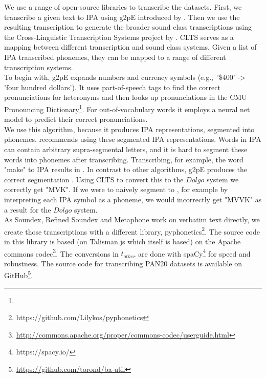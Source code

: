 We use a range of open-source libraries to transcribe the datasets.
First, we transcribe a given text to IPA using g2pE introduced by \cite{kyubyong2019g2pE}.
Then we use the resulting transcription to generate the broader sound class transcriptions using the Cross-Linguistic Transcription Systems project by \cite{list2018cltsIntro}.
CLTS serves as a mapping between different transcription and sound class systems.
Given a list of IPA transcribed phonemes, they can be mapped to a range of different transcription systems.\\
To begin with, g2pE expands numbers and currency symbols (e.g.,\ '\$400' -> 'four hundred dollars').
It uses part-of-speech tags to find the correct pronunciations for heteronyms and then looks up pronunciations in the CMU Pronouncing Dictionary\footnote{}.
For out-of-vocabulary words it employs a neural net model to predict their correct pronunciations.\\
We use this algorithm, because it produces IPA representations, segmented into phonemes.
\cite{list2018sequence} recommends using these segmented IPA representations.
Words in IPA can contain arbitrary supra-segmental letters, and it is hard to segment these words into phonemes after transcribing.
Transcribing, for example, the word "make" to IPA results in \textipa{[meIk]}.
In contrast to other algorithms, g2pE produces the correct segmentation \textipa{[m eI k]}.
Using CLTS to convert this to the $Dolgo$ system we correctly get "MVK".
If we were to naively segment \textipa{[meIk]} to \textipa{[m e I k]}, for example by interpreting each IPA symbol as a phoneme, we would incorrectly get "MVVK" as a result for the $Dolgo$ system.\\
As Soundex, Refined Soundex and Metaphone work on verbatim text directly, we create those transcriptions with a different library, pyphonetics\footnote{https://github.com/Lilykos/pyphonetics}.
The source code in this library is based (on Talisman.js which itself is based) on the Apache commons codec\footnote{\url{http://commons.apache.org/proper/commons-codec/userguide.html}}.
The conversions in $t_{other}$ are done with spaCy\footnote{https://spacy.io/} for speed and robustness.
The source code for transcribing PAN20 datasets is available on GitHub\footnote{\url{https://github.com/torond/ba-util}}.


